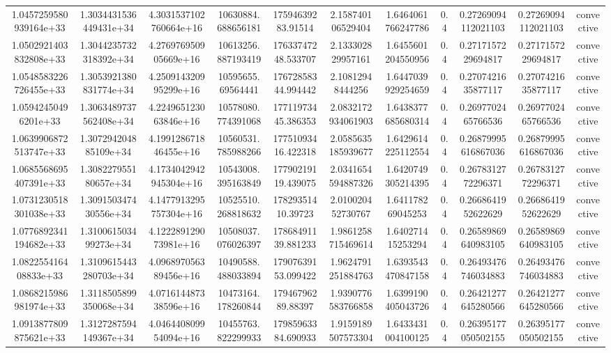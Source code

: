 \begin{table}
\begin{tabular}{ccccccccccc}
1.0457259580939164e+33 & 1.3034431536449431e+34 & 4.3031537102760664e+16 & 10630884.688656181 & 17594639283.91514 & 2.158740106529404 & 1.6464061766247786 & 0.4 & 0.27269094112021103 & 0.27269094112021103 & convective \\
1.0502921403832808e+33 & 1.3044235732318392e+34 & 4.276976950905669e+16 & 10613256.887193419 & 17633747248.533707 & 2.133302829957161 & 1.6455601204550956 & 0.4 & 0.2717157229694817 & 0.2717157229694817 & convective \\
1.0548583226726455e+33 & 1.3053921380831774e+34 & 4.250914320995299e+16 & 10595655.69564441 & 17672858344.994442 & 2.10812948444256 & 1.6447039929254659 & 0.4 & 0.2707421635877117 & 0.2707421635877117 & convective \\
1.05942450496201e+33 & 1.3063489737562408e+34 & 4.224965123063846e+16 & 10578080.774391068 & 17711973445.386353 & 2.0832172934061903 & 1.6438377685680314 & 0.4 & 0.2697702465766536 & 0.2697702465766536 & convective \\
1.0639906872513747e+33 & 1.307294204885109e+34 & 4.199128671846455e+16 & 10560531.785988266 & 17751093416.422318 & 2.0585635185939677 & 1.6429614225112554 & 0.4 & 0.26879995616867036 & 0.26879995616867036 & convective \\
1.0685568695407391e+33 & 1.308227955180657e+34 & 4.1734042942945304e+16 & 10543008.395163849 & 17790219119.439075 & 2.0341654594887326 & 1.6420749305214395 & 0.4 & 0.2678312772296371 & 0.2678312772296371 & convective \\
1.0731230518301038e+33 & 1.309150347430556e+34 & 4.1477913295757304e+16 & 10525510.268818632 & 17829351410.39723 & 2.010020452730767 & 1.641178269045253 & 0.4 & 0.2668641952622629 & 0.2668641952622629 & convective \\
1.0776892341194682e+33 & 1.310061503499273e+34 & 4.122289129073981e+16 & 10508037.076026397 & 17868491139.881233 & 1.9861258715469614 & 1.640271415253294 & 0.4 & 0.26589869640983105 & 0.26589869640983105 & convective \\
1.082255416408833e+33 & 1.3109615443280703e+34 & 4.096897056389456e+16 & 10490588.488033894 & 17907639153.099422 & 1.9624791251884763 & 1.6393543470847158 & 0.4 & 0.26493476746034883 & 0.26493476746034883 & convective \\
1.0868215986981974e+33 & 1.3118505899350068e+34 & 4.071614487338596e+16 & 10473164.178260844 & 17946796289.88397 & 1.9390776583766858 & 1.6399190405043726 & 0.4 & 0.26421277645280566 & 0.26421277645280566 & convective \\
1.0913877809875621e+33 & 1.3127287594149367e+34 & 4.046440809954094e+16 & 10455763.822299933 & 17985963384.690933 & 1.9159189507573304 & 1.6433431004100125 & 0.4 & 0.26395177050502155 & 0.26395177050502155 & convective \\

\end{tabular}
\end{table}
